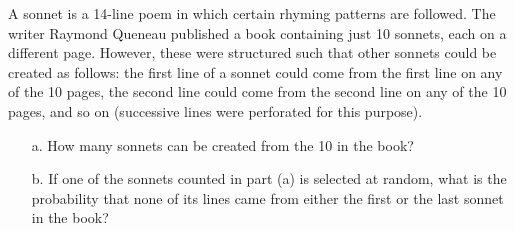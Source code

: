 \documentclass[letterpaper,12pt]{article}
\begin{document}
\begin{enumerate}
    A sonnet is a 14-line poem in which certain rhyming patterns are followed. The writer Raymond Queneau published a book containing just 10 sonnets, each on a different page. However, these were structured such that other sonnets could be created as follows: the first line of a sonnet could come from the first line on any of the 10 pages, the second line could come from the second line on any of the 10 pages, and so on (successive lines were perforated for this purpose).
    \begin{enumerate}
        \item[a.]
          How many sonnets can be created from the 10 in the book?
        \item[b.]
          If one of the sonnets counted in part (a) is selected at random, what is the probability that none of its lines came from either the first or the last sonnet in the book?
      \end{enumerate}
\end{enumerate}
\end{document}
